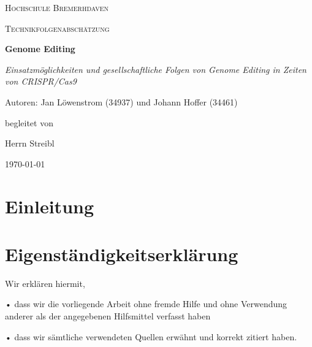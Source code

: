 \documentclass[a4paper, 12pt]{article}
\begin{document}
\begin{titlepage}
	\centering	
	{\scshape\LARGE Hochschule Bremerhdaven \par}
	\vspace{1cm}
	{\scshape\Large Technikfolgenabschätzung\par}
	\vspace{1.5cm}
	{\huge\bfseries Genome Editing\par}
	\vspace{2cm}
	{\Large\itshape Einsatzmöglichkeiten und gesellschaftliche Folgen von Genome Editing in Zeiten von CRISPR/Cas9 \par}
	\vfill Autoren: Jan Löwenstrom (34937) und Johann Hoffer (34461) \par
	begleitet von\par
	Herrn Streibl
    \vfill


	{\large \today\par}       
\end{titlepage}
\tableofcontents
\pagebreak
\listoffigures
\newpage

\noindent
\pagestyle{fancy}

\fancyhf{}
\cfoot{\thepage}

\section{Einleitung}


\pagebreak
\section{Eigenständigkeitserklärung}
Wir erklären hiermit,

• dass wir die vorliegende Arbeit ohne fremde Hilfe und
ohne Verwendung anderer als der angegebenen
Hilfsmittel verfasst haben

• dass wir sämtliche verwendeten Quellen erwähnt und
korrekt zitiert haben.

\pagebreak



\pagebreak
\end{document}
